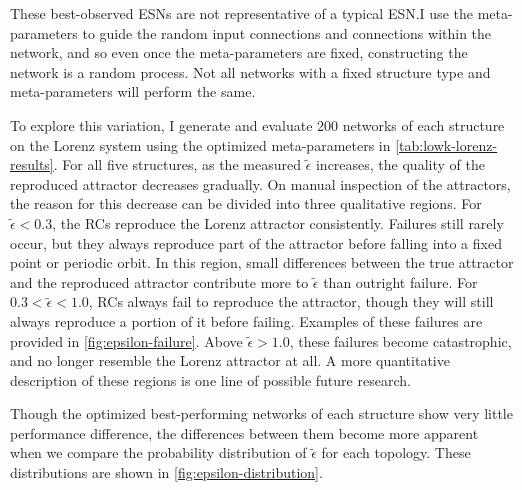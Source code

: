 These best-observed ESNs are not representative of a
typical ESN.\@ I use the meta-parameters to guide the random input
connections and connections within the network, and so even once the
meta-parameters are fixed, constructing the network is a random
process. Not all networks with a fixed structure type and meta-parameters
will perform the same.

To explore this variation, I generate and evaluate $200$ networks of
each structure on the Lorenz system using the optimized
meta-parameters in \cref{tab:lowk-lorenz-results}. For all five
structures, as the measured $\tilde{\epsilon}$ increases, the quality
of the reproduced attractor decreases gradually. On manual inspection
of the attractors, the reason for this decrease can be divided into
three qualitative regions. For $\tilde{\epsilon} < 0.3$, the RCs
reproduce the Lorenz attractor consistently. Failures still rarely
occur, but they always reproduce part of the attractor before falling
into a fixed point or periodic orbit. In this region, small
differences between the true attractor and the reproduced attractor
contribute more to $\tilde{\epsilon}$ than outright failure. For $0.3
< \tilde{\epsilon} < 1.0$, RCs always fail to reproduce the attractor,
though they will still always reproduce a portion of it before
failing. Examples of these failures are provided in
\cref{fig:epsilon-failure}. Above $\tilde{\epsilon} > 1.0$, these
failures become catastrophic, and no longer resemble the Lorenz
attractor at all. A more quantitative description of these regions is
one line of possible future research.

Though the optimized best-performing networks of
each structure show very little performance difference, the differences
between them become more apparent when we compare the probability
distribution of $\tilde{\epsilon}$ for each topology. These
distributions are shown in \cref{fig:epsilon-distribution}.

